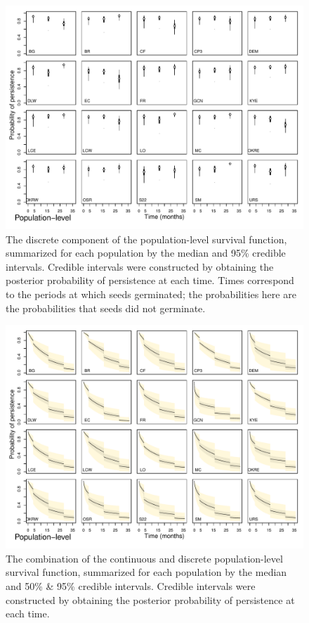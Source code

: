 \documentclass[12pt, oneside]{article}   	%
\begin{document}
 \begin{figure}[!h]
   \centering
       \includegraphics[page=1,width=1\textwidth]{../../figures/survival-function-discrete.pdf}  
    \caption{ The discrete component of the population-level survival function, summarized for each population by the median and 95\% credible intervals. Credible intervals were constructed by obtaining the posterior probability of persistence at each time. Times correspond to the periods at which seeds germinated; the probabilities here are the probabilities that seeds did not germinate.  }
 \label{fig:viability-estimates-population}
\end{figure}

 \begin{figure}[!h]
   \centering
       \includegraphics[page=1,width=1\textwidth]{../../figures/survival-function-compound.pdf}  
    \caption{ The combination of the continuous and discrete population-level survival function, summarized for each population by the median and 50\% \& 95\% credible intervals. Credible intervals were constructed by obtaining the posterior probability of persistence at each time. }
 \label{fig:viability-estimates-population}
\end{figure}
\end{document}
